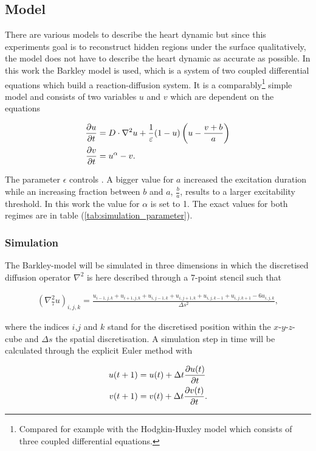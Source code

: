 \subsection{Model}
There are various models to describe the heart dynamic but since this experiments goal is to reconstruct hidden regions under the surface qualitatively, the model does not have to describe the heart dynamic as accurate as possible. In this work the Barkley model is used, which is a system of two coupled differential equations which build a reaction-diffusion system. It is a comparably\footnote{Compared for example with the Hodgkin-Huxley model which consists of three coupled differential equations.} simple model and consists of two variables $u$ and $v$ which are dependent on the equations

\begin{align}
    \frac{\partial u}{\partial t}&=D\cdot \nabla^2u+\frac{1}{\varepsilon}(1-u)\left(u-\frac{v+b}{a}\right)\notag\\
    \frac{\partial v}{\partial t}&=u^{\alpha}-v.\notag\\
\end{align}

The parameter $\epsilon$ controls . A bigger value for $a$ increased the excitation duration while an increasing fraction between $b$ and $a$, $\frac{b}{a}$, results to a larger excitability threshold. In this work the value for $\alpha$ is set to 1. The exact values for both regimes are in table (\ref{tab:simulation_parameter}).

\subsubsection{Simulation}
The Barkley-model will be simulated in three dimensions in which the discretised diffusion operator $\nabla^2$ is here described through a 7-point stencil such that

\begin{align}
    \left(\nabla_7^2u\right)_{i,j,k}=\frac{u_{i-1,j,k}+u_{i+1,j,k}+u_{i,j-1,k}+u_{i,j+1,k}+u_{i,j,k-1}+u_{i,j,k+1}-6u_{i,j,k}}{\Delta s^2},
\end{align}

where the indices $i$,$j$ and $k$ stand for the discretised position within the $x$-$y$-$z$-cube and $\Delta s$ the spatial discretisation. A simulation step in time will be calculated through the explicit Euler method with

\begin{align}
    u(t+1)&=u(t)+\Delta t\frac{\partial u(t)}{\partial t}\notag\\
    v(t+1)&=v(t)+\Delta t\frac{\partial v(t)}{\partial t}.\notag\\
\end{align}

